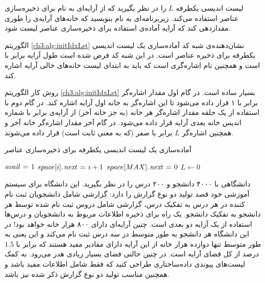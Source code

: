  لیست اندیسی یکطرفه {$L$} را در نظر بگیرید که از آرایه‌ای به نام {} برای ذخیره‌سازی عناصر استفاده می‌کند. زیربرنامه‌ای به نام {} بنویسید که خانه‌های آرایه‌ی {} را طوری مقداردهی کند که آرایه آماده‌ی استفاده برای ذخیره‌سازی عناصر لیست شود.


الگوریتم {\eqref{ch3:alg:initIdxLst}} نشان‌دهنده‌ی شبه کد آماده‌سازی یک لیست اندیسی یکطرفه برای ذخیره عناصر است. در این شبه کد فرض شده است طول آرایه {} برابر با {} است و همچنین {} نام اشاره‌گری است که باید به ابتدای لیست خانه‌های خالی آرایه اشاره کند.

روش کار الگوریتم {\eqref{ch3:alg:initIdxLst}} بسیار ساده است. در گام اول مقدار اشاره‌گر {} برابر با ۱ قرار داده می‌شود تا این اشاره‌گر به خانه اول آرایه اشاره کند. در گام دوم با استفاده از یک حلقه مقدار اشاره‌گر {} هر خانه (به جز خانه آخر) از آرایه‌ی {} برابر با شماره اندیس خانه بعدی آرایه قرار داده می‌شود. در گام آخر مقدار اشاره‌گر {} خانه آخر و همچنین اشاره‌گر {$L$} برابر با صفر (که به معنی ثابت {} است) قرار داده می‌شوند.

\begin{algorithm}
\caption{آماده‌سازی یک لیست اندیسی یکطرفه برای ذخیره‌سازی عناصر}\label{ch3:alg:initIdxLst}
\begin{latin}
\begin{algorithmic}[1]
    \State    $\mathit{avail} \mathrel{\hspace{1pt}=\hspace{1pt}} 1$
        \State    $space[i].\hspace*{1pt}\mathit{next} \mathrel{\hspace{1pt}=\hspace{1pt}} i + 1$
    \EndFor
    \State    $space[MAX].\hspace*{1pt}\mathit{next} \mathrel{\hspace{1pt}=\hspace{1pt}} 0$
    \State    $L \gets 0$
\EndProcedure
\end{algorithmic}
\end{latin}
\end{algorithm}

 دانشگاهی با ۴۰۰۰ دانشجو و ۲۰۰ درس را در نظر بگیرید. این دانشگاه برای سیستم آموزشی خود قصد تولید دو نوع گزارش را دارد:
 گزارشی شامل دانشجویان ثبت نام کننده در هر درس به تفکیک درس،
 گزارشی شامل دروس ثبت نام شده توسط هر دانشجو به تفکیک دانشجو.
یک راه برای ذخیره اطلاعات مربوط به دانشجویان و درس‌ها استفاده از یک آرایه دو بعدی است. چنین آرایه‌ای دارای ۸۰۰ هزار خانه خواهد بود! در این دانشگاه هر دانشجو به طور متوسط در سه درس ثبت نام می‌کند و این یعنی به طور متوسط تنها دوازده هزار خانه از این آرایه دارای مقادیر مفید هستند که برابر با {$1.5$} درصد از کل فضای آرایه است. در چنین حالتی فضای بسیار زیادی هدر می‌رود. به کمک لیست‌های پیوندی داده‌ساختاری طراحی کنید که فقط شامل اطلاعات مفید باشد و همچنین مناسب تولید دو نوع گزارش ذکر شده نیز باشد.

